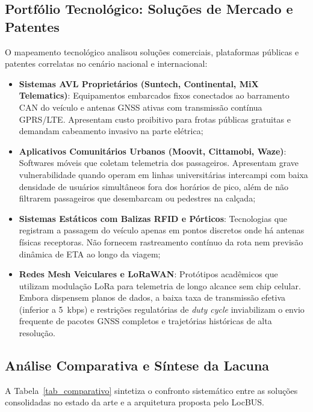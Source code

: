 \documentclass[lettersize,journal]{IEEEtran}
\begin{document}
\subsection{Portfólio Tecnológico: Soluções de Mercado e Patentes}
O mapeamento tecnológico analisou soluções comerciais, plataformas públicas e patentes correlatas no cenário nacional e internacional:
\begin{itemize}
    \item \textbf{Sistemas AVL Proprietários (Suntech, Continental, MiX Telematics)}: Equipamentos embarcados fixos conectados ao barramento CAN do veículo e antenas GNSS ativas com transmissão contínua GPRS/LTE. Apresentam custo proibitivo para frotas públicas gratuitas e demandam cabeamento invasivo na parte elétrica;
    \item \textbf{Aplicativos Comunitários Urbanos (Moovit, Cittamobi, Waze)}: Softwares móveis que coletam telemetria dos passageiros. Apresentam grave vulnerabilidade quando operam em linhas universitárias intercampi com baixa densidade de usuários simultâneos fora dos horários de pico, além de não filtrarem passageiros que desembarcam ou pedestres na calçada;
    \item \textbf{Sistemas Estáticos com Balizas RFID e Pórticos}: Tecnologias que registram a passagem do veículo apenas em pontos discretos onde há antenas físicas receptoras. Não fornecem rastreamento contínuo da rota nem previsão dinâmica de ETA ao longo da viagem;
    \item \textbf{Redes Mesh Veiculares e LoRaWAN}: Protótipos acadêmicos que utilizam modulação LoRa para telemetria de longo alcance sem chip celular. Embora dispensem planos de dados, a baixa taxa de transmissão efetiva (inferior a 5~kbps) e restrições regulatórias de \textit{duty cycle} inviabilizam o envio frequente de pacotes GNSS completos e trajetórias históricas de alta resolução.
\end{itemize}

\subsection{Análise Comparativa e Síntese da Lacuna}
A Tabela~\ref{tab_comparativo} sintetiza o confronto sistemático entre as soluções consolidadas no estado da arte e a arquitetura proposta pelo LocBUS.
\end{document}
